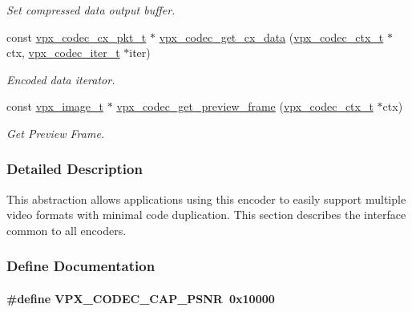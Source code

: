 \begin{DoxyCompactItemize}
\begin{DoxyCompactList}\small\item\em \-Set compressed data output buffer. \end{DoxyCompactList}\item 
const \hyperlink{group__encoder_ga3f711e17fbefac545e8959ef5a023556}{vpx\-\_\-codec\-\_\-cx\-\_\-pkt\-\_\-t} $\ast$ \hyperlink{group__encoder_gae81cab25d66cf3bc59f1f75f8a5af720}{vpx\-\_\-codec\-\_\-get\-\_\-cx\-\_\-data} (\hyperlink{group__codec_gad03e2dfa6ae511db7d25be6bbb336233}{vpx\-\_\-codec\-\_\-ctx\-\_\-t} $\ast$ctx, \hyperlink{group__codec_ga6ea348f76b1f8a1fe50e14db684146c6}{vpx\-\_\-codec\-\_\-iter\-\_\-t} $\ast$iter)
\begin{DoxyCompactList}\small\item\em \-Encoded data iterator. \end{DoxyCompactList}\item 
const \hyperlink{vpx__image_8h_abf5ac962cc6d71b4f0e39b1b0d033e55}{vpx\-\_\-image\-\_\-t} $\ast$ \hyperlink{group__encoder_ga250aee4536aa2475e85cf61c9710c963}{vpx\-\_\-codec\-\_\-get\-\_\-preview\-\_\-frame} (\hyperlink{group__codec_gad03e2dfa6ae511db7d25be6bbb336233}{vpx\-\_\-codec\-\_\-ctx\-\_\-t} $\ast$ctx)
\begin{DoxyCompactList}\small\item\em \-Get \-Preview \-Frame. \end{DoxyCompactList}\end{DoxyCompactItemize}


\subsubsection{\-Detailed \-Description}
\-This abstraction allows applications using this encoder to easily support multiple video formats with minimal code duplication. \-This section describes the interface common to all encoders. 

\subsubsection{\-Define \-Documentation}
\hypertarget{group__encoder_ga398803f408d6f71aae730b5ee7793e1c}{
\paragraph[{\-V\-P\-X\-\_\-\-C\-O\-D\-E\-C\-\_\-\-C\-A\-P\-\_\-\-P\-S\-N\-R}]{\setlength{\rightskip}{0pt plus 5cm}\#define \-V\-P\-X\-\_\-\-C\-O\-D\-E\-C\-\_\-\-C\-A\-P\-\_\-\-P\-S\-N\-R~0x10000}}
\label{group__encoder_ga398803f408d6f71aae730b5ee7793e1c}


